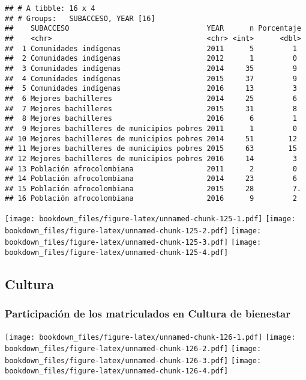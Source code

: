 \documentclass[]{article}
\theoremstyle{definition}
\theoremstyle{definition}
\theoremstyle{definition}
\theoremstyle{remark}
\begin{document}
\begin{verbatim}
## # A tibble: 16 x 4
## # Groups:   SUBACCESO, YEAR [16]
##    SUBACCESO                                YEAR      n Porcentaje
##    <chr>                                    <chr> <int>      <dbl>
##  1 Comunidades indígenas                    2011      5         1 
##  2 Comunidades indígenas                    2012      1         0 
##  3 Comunidades indígenas                    2014     35         9 
##  4 Comunidades indígenas                    2015     37         9 
##  5 Comunidades indígenas                    2016     13         3 
##  6 Mejores bachilleres                      2014     25         6 
##  7 Mejores bachilleres                      2015     31         8 
##  8 Mejores bachilleres                      2016      6         1 
##  9 Mejores bachilleres de municipios pobres 2011      1         0 
## 10 Mejores bachilleres de municipios pobres 2014     51        12 
## 11 Mejores bachilleres de municipios pobres 2015     63        15 
## 12 Mejores bachilleres de municipios pobres 2016     14         3 
## 13 Población afrocolombiana                 2011      2         0 
## 14 Población afrocolombiana                 2014     23         6 
## 15 Población afrocolombiana                 2015     28         7.
## 16 Población afrocolombiana                 2016      9         2
\end{verbatim}

\texttt{[image: bookdown\_files/figure-latex/unnamed-chunk-125-1.pdf]}
\texttt{[image: bookdown\_files/figure-latex/unnamed-chunk-125-2.pdf]}
\texttt{[image: bookdown\_files/figure-latex/unnamed-chunk-125-3.pdf]}
\texttt{[image: bookdown\_files/figure-latex/unnamed-chunk-125-4.pdf]}

\subsection{Cultura}\label{cultura}

\subsubsection{Participación de los matriculados en Cultura de
bienestar}\label{participacion-de-los-matriculados-en-cultura-de-bienestar}

\texttt{[image: bookdown\_files/figure-latex/unnamed-chunk-126-1.pdf]}
\texttt{[image: bookdown\_files/figure-latex/unnamed-chunk-126-2.pdf]}
\texttt{[image: bookdown\_files/figure-latex/unnamed-chunk-126-3.pdf]}
\texttt{[image: bookdown\_files/figure-latex/unnamed-chunk-126-4.pdf]}
\end{document}
